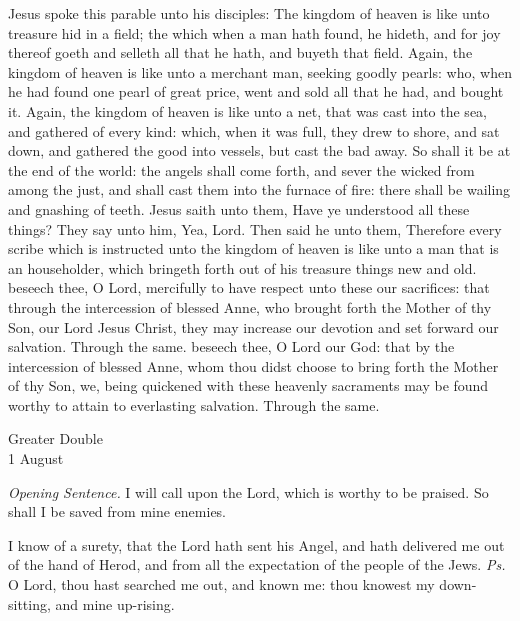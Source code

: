  Jesus spoke this parable unto his disciples: The kingdom of heaven is like unto treasure hid in a field; the which when a man hath found, he hideth, and for joy thereof goeth and selleth all that he hath, and buyeth that field. Again, the kingdom of heaven is like unto a merchant man, seeking goodly pearls: who, when he had found one pearl of great price, went and sold all that he had, and bought it. Again, the kingdom of heaven is like unto a net, that was cast into the sea, and gathered of every kind: which, when it was full, they drew to shore, and sat down, and gathered the good into vessels, but cast the bad away. So shall it be at the end of the world: the angels shall come forth, and sever the wicked from among the just, and shall cast them into the furnace of fire: there shall be wailing and gnashing of teeth. Jesus saith unto them, Have ye understood all these things? They say unto him, Yea, Lord. Then said he unto them, Therefore every scribe which is instructed unto the kingdom of heaven is like unto a man that is an householder, which bringeth forth out of his treasure things new and old.
\secret
{} beseech thee, O Lord, mercifully to have respect unto these our sacrifices: that through the intercession of blessed Anne, who brought forth the Mother of thy Son, our Lord Jesus Christ, they may increase our devotion and set forward our salvation. Through the same.
\postcommunion
{} beseech thee, O Lord our God: that by the intercession of blessed Anne, whom thou didst choose to bring forth the Mother of thy Son, we, being quickened with these heavenly sacraments may be found worthy to attain to everlasting salvation. Through the same.

\begin{inhead}
    {Greater Double\\
1 August}
\end{inhead}
\par\noindent
\textit{Opening Sentence.} I will call upon the Lord, which is worthy to be praised. So shall I be saved from mine enemies.%

\introit
{} I know of a surety, that the Lord hath sent his Angel, and hath delivered me out of the hand of Herod, and from all the expectation of the people of the Jews. \textit{Ps.} O Lord, thou hast searched me out, and known me: thou knowest my down-sitting, and mine up-rising.

